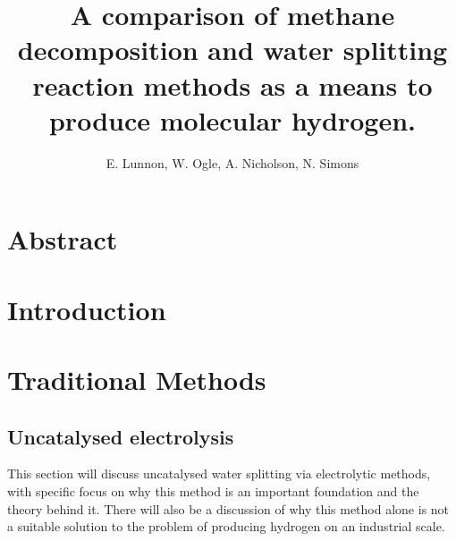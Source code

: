 \documentclass[a4paper]{article}
\title{A comparison of methane decomposition and water splitting reaction methods as a means to produce molecular hydrogen.}
\author{E. Lunnon, W. Ogle, A. Nicholson, N. Simons}
\begin{document}
\maketitle
\tableofcontents
\newpage


\section*{Abstract}%
\label{sec:abstract}

\cite{lei2019}

\clearpage


\section{Introduction}%
\label{sec:introduction}



\clearpage

\section{Traditional Methods}%
\label{sub:Traditional_Methods}





\subsection{Uncatalysed electrolysis}%
\label{sub:Uncatalysed_electrolysis}

This section will discuss uncatalysed water splitting via electrolytic methods, with specific focus on why this method is an important foundation and the theory behind it.
There will also be a discussion of why this method alone is not a suitable solution to the problem of producing hydrogen on an industrial scale.
\end{document}
